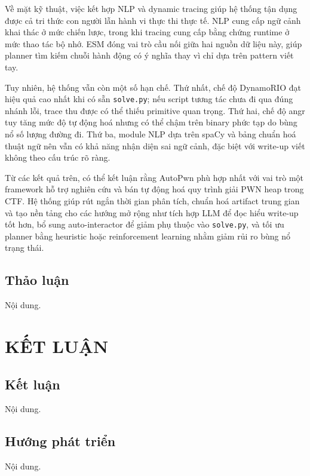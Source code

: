 \documentclass[final]{hcmuitthesis}
\begin{document}
Về mặt kỹ thuật, việc kết hợp NLP và dynamic tracing giúp hệ thống tận dụng được cả tri thức con người lẫn hành vi thực thi thực tế. NLP cung cấp ngữ cảnh khai thác ở mức chiến lược, trong khi tracing cung cấp bằng chứng runtime ở mức thao tác bộ nhớ. ESM đóng vai trò cầu nối giữa hai nguồn dữ liệu này, giúp planner tìm kiếm chuỗi hành động có ý nghĩa thay vì chỉ dựa trên pattern viết tay.

Tuy nhiên, hệ thống vẫn còn một số hạn chế. Thứ nhất, chế độ DynamoRIO đạt hiệu quả cao nhất khi có sẵn \texttt{solve.py}; nếu script tương tác chưa đi qua đúng nhánh lỗi, trace thu được có thể thiếu primitive quan trọng. Thứ hai, chế độ angr tuy tăng mức độ tự động hoá nhưng có thể chậm trên binary phức tạp do bùng nổ số lượng đường đi. Thứ ba, module NLP dựa trên spaCy và bảng chuẩn hoá thuật ngữ nên vẫn có khả năng nhận diện sai ngữ cảnh, đặc biệt với write-up viết không theo cấu trúc rõ ràng.

Từ các kết quả trên, có thể kết luận rằng AutoPwn phù hợp nhất với vai trò một framework hỗ trợ nghiên cứu và bán tự động hoá quy trình giải PWN heap trong CTF. Hệ thống giúp rút ngắn thời gian phân tích, chuẩn hoá artifact trung gian và tạo nền tảng cho các hướng mở rộng như tích hợp LLM để đọc hiểu write-up tốt hơn, bổ sung auto-interactor để giảm phụ thuộc vào \texttt{solve.py}, và tối ưu planner bằng heuristic hoặc reinforcement learning nhằm giảm rủi ro bùng nổ trạng thái.

\section{Thảo luận}

Nội dung.

\chapter{KẾT LUẬN}

\section{Kết luận}

Nội dung.

\section{Hướng phát triển}

Nội dung.






\end{document}
